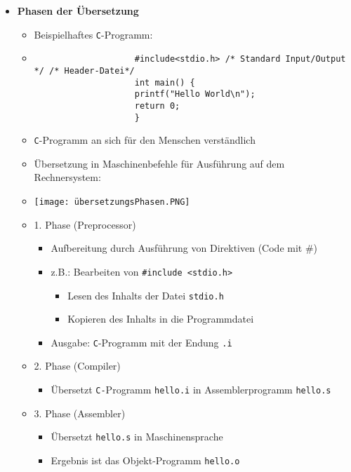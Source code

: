 \begin{itemize}
        \item \textbf{Phasen der Übersetzung}
            \begin{itemize}
                \item Beispielhaftes \texttt{C}-Programm:
                \item[]
                    \begin{verbatim}
                    #include<stdio.h> /* Standard Input/Output */ /* Header-Datei*/
                    int main() {
                    printf("Hello World\n");
                    return 0;
                    }
                    \end{verbatim}
                \item \texttt{C}-Programm an sich für den Menschen verständlich
                \item Übersetzung in Maschinenbefehle für Ausführung auf dem Rechnersystem:
                \item[] \texttt{[image: übersetzungsPhasen.PNG]}
                \item 1. Phase (Preprocessor)
                    \begin{itemize}
                        \item Aufbereitung durch Ausführung von Direktiven (Code mit \#)
                        \item z.B.: Bearbeiten von \texttt{\#include <stdio.h>}
                            \begin{itemize}
                                \item Lesen des Inhalts der Datei \texttt{stdio.h}
                                \item Kopieren des Inhalts in die Programmdatei
                            \end{itemize}
                        \item Ausgabe: \texttt{C}-Programm mit der Endung \texttt{.i} 
                    \end{itemize}
                
                \item 2. Phase (Compiler)
                    \begin{itemize}
                        \item Übersetzt \texttt{C-}Programm \texttt{hello.i} in Assemblerprogramm \texttt{hello.s}
                    \end{itemize}

                \item 3. Phase (Assembler)
                    \begin{itemize}
                        \item Übersetzt \texttt{hello.s} in Maschinensprache
                        \item Ergebnis ist das Objekt-Programm \texttt{hello.o}
                    \end{itemize}


\end{itemize}
\end{itemize}
